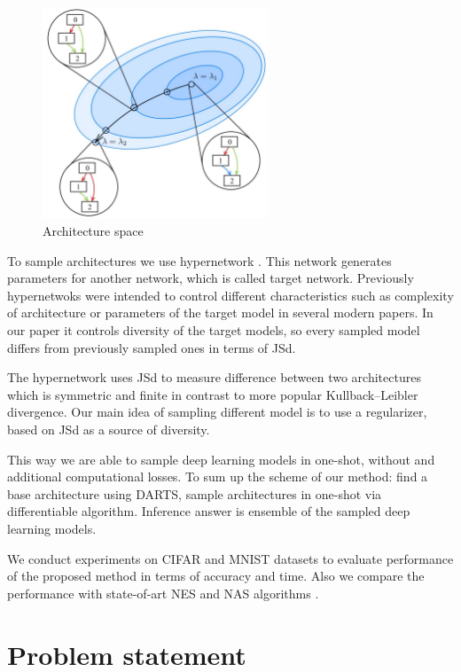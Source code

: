 \documentclass{article}
\begin{document}
\begin{figure}[h]
    \centering
    \includegraphics[width=0.6\textwidth]{fig1}
    \caption{\label{fig:arch}Architecture space}
\end{figure}

To sample architectures we use hypernetwork \citep{hypernetworks}. This network generates parameters for another network, which is called target network.
Previously hypernetwoks were intended to control different characteristics such as
complexity of architecture \citep{darts-cc} or parameters of the target model \citep{cont-learn} in several modern papers. In our paper it controls 
diversity of the target models, so every sampled model differs from previously sampled ones in terms of JSd.

The hypernetwork uses JSd to measure difference between two architectures which is symmetric and finite
in contrast to more popular Kullback–Leibler divergence. Our main idea of sampling different model is to use a regularizer,
based on JSd as a source of diversity.

This way we are able to sample deep learning models in one-shot, without and additional computational losses.
To sum up the scheme of our method: find a base architecture using DARTS, sample architectures in one-shot via differentiable algorithm. Inference answer is ensemble of the sampled deep learning models.

We conduct experiments on CIFAR and MNIST datasets to evaluate performance of the proposed method in terms of accuracy and time. Also we compare the performance with state-of-art NES and NAS algorithms \citep{darts, ???}.

\section{Problem statement}
\end{document}
